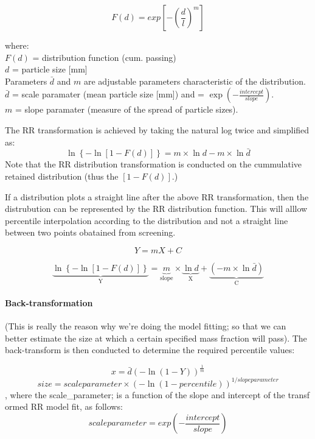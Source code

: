 \documentclass[
]{article}
\begin{document}
\begin{equation}

  F\left(d\right) = exp\left[-(\frac{d}{l})^{m} \right]

  \label{eq : RR}
\end{equation}

where:\\
\(F(d)\) = distribution function (cum. passing)\\
\(d\) = particle size {[}mm{]}\\
Parameters \(\bar{d}\) and \(m\) are adjustable parameters
characteristic of the distribution.\\
\(\bar{d}\) = scale paramater (mean particle size {[}mm{]}) and =
\(\exp\left({-\frac{intercept}{slope}}\right)\).\\
\(m\) = slope paramater (measure of the spread of particle sizes).

The RR transformation is achieved by taking the natural log twice and
simplified as:
\[\ln\left\{-\ln\left[1-F(d)\right] \right\} = m\times \ln d - m\times \ln \bar{d} \]
Note that the RR distribution transformation is conducted on the
cummulative retained distribution (thus the \(\left[1-F(d)\right]\).)

If a distribution plots a straight line after the above RR
transformation, then the distrubution can be represented by the RR
distribution function. This will alllow percentile interpolation
according to the distribution and not a straight line between two points
obatained from screening.

\[ Y=mX + C\]

\[\underbrace{\ln\left\{-\ln\left[1-F(d)\right] \right\}}_\textrm{Y} =  \underbrace{m}_\textrm{slope}\times \underbrace{\ln d}_\textrm{X}+\underbrace{ \left(-m\times \ln \bar{d}\right)}_\textrm{C} \]

\hypertarget{back-transformation}{%
\paragraph{Back-transformation}\label{back-transformation}}

(This is really the reason why we're doing the model fitting; so that we
can better estimate the size at which a certain specified mass fraction
will pass). The back-transform is then conducted to determine the
required percentile values:

\[ x = \bar{d} \left(- \ln \left(1-Y \right)    \right)^\frac{1}{m}\]
\[size = scale parameter\times (-\ln (1-percentile))^{1/slope parameter}\]
, where the scale\_parameter; is a function of the slope and intercept
of the transf ormed RR model fit, as follows:
\[scale parameter = exp(-\frac{intercept}{slope} )\]
\end{document}

